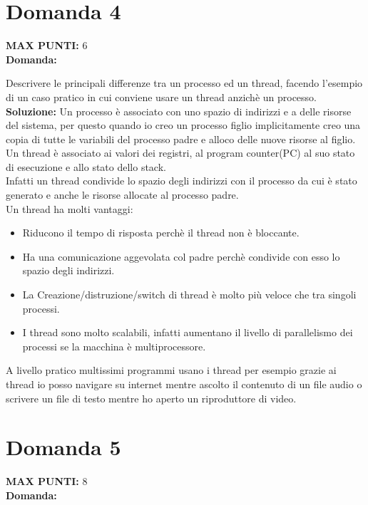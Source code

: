\documentclass{article}
\begin{document}
   \section*{Domanda 4}
   \textbf{MAX PUNTI:} 6\\
   \textbf{Domanda:}


   Descrivere le principali differenze tra un processo ed un thread, facendo l'esempio di un caso pratico in cui conviene usare un thread anzichè un processo.\\
   \textbf{Soluzione:}
   Un processo è associato con uno spazio di indirizzi e a delle risorse del sistema, per questo quando io creo un processo figlio implicitamente creo una copia di tutte le variabili del processo padre e alloco delle nuove risorse al figlio.\\
   Un thread è associato ai valori dei registri, al program counter(PC) al suo stato di esecuzione e allo stato dello stack.\\
   Infatti un thread condivide lo spazio degli indirizzi con il processo da cui è stato generato e anche le risorse allocate al processo padre.\\
   Un thread ha molti vantaggi:
   \begin{itemize}
      \item Riducono il tempo di risposta perchè il thread non è bloccante.
      \item Ha una comunicazione aggevolata col padre perchè condivide con esso lo spazio degli indirizzi.
      \item La Creazione/distruzione/switch di thread è molto più veloce che tra singoli processi.
      \item I thread sono molto scalabili, infatti aumentano il livello di parallelismo dei processi se la macchina è multiprocessore.
   \end{itemize}
   A livello pratico multissimi programmi usano i thread per esempio grazie ai thread io posso navigare su internet mentre ascolto il contenuto di un file audio o scrivere un file di testo mentre ho aperto un riproduttore di video.
   \section*{Domanda 5}
   \textbf{MAX PUNTI:} 8\\
   \textbf{Domanda:}
\end{document}
